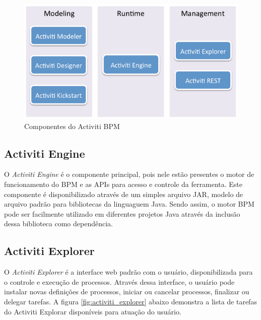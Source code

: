 \begin{figure}[H]
\centering
\includegraphics[width=1\textwidth]{imagens/activiti_components_overview.png}
\caption{Componentes do Activiti BPM\cite{activiti_componentes}}
\label{fig:activiti_componentes}
\end{figure}

\subsection{Activiti Engine}\label{sec:automatizacao_processos-gestao_processos_activiti_engine}

O \textit{Activiti Engine} é o componente principal, pois nele estão presentes o motor de funcionamento do BPM e as APIs para acesso e controle da ferramenta. Este componente é disponibilizado através de um simples arquivo JAR\cite{jar}, modelo de arquivo padrão para bibliotecas da linguaguem Java. Sendo assim, o motor BPM pode ser facilmente utilizado em diferentes projetos Java através da inclusão dessa biblioteca como dependência.

\subsection{Activiti Explorer}\label{sec:automatizacao_processos-gestao_processos_activiti_explorer}

O \textit{Activiti Explorer} é a interface web padrão com o usuário, disponibilizada para o controle e execução de processos. Através dessa interface, o usuário pode instalar novas definições de processos, iniciar ou cancelar processos, finalizar ou delegar tarefas. A figura \ref{fig:activiti_explorer} abaixo demonstra a lista de tarefas do Activiti Explorar disponíveis para atuação do usuário.

